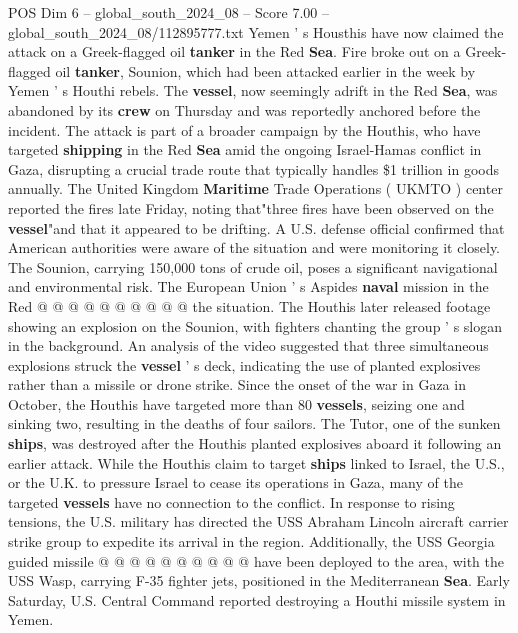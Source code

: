 \begin{textsample}{POS Dim 6 – global\_south\_2024\_08 – Score 7.00 – global\_south\_2024\_08/112895777.txt}  \label{ex:f6_pos_324}
Yemen ' s Housthis have now claimed the attack on a Greek-flagged oil \textbf{tanker} in the Red \textbf{Sea}.
Fire broke out on a Greek-flagged oil \textbf{tanker}, Sounion, which had been attacked earlier in the week by Yemen ' s Houthi rebels.
The \textbf{vessel}, now seemingly adrift in the Red \textbf{Sea}, was abandoned by its \textbf{crew} on Thursday and was reportedly anchored before the incident.
The attack is part of a broader campaign by the Houthis, who have targeted \textbf{shipping} in the Red \textbf{Sea} amid the ongoing Israel-Hamas conflict in Gaza, disrupting a crucial trade route that typically handles \$1 trillion in goods annually.
The United Kingdom \textbf{Maritime} Trade Operations ( UKMTO ) center reported the fires late Friday, noting that"three fires have been observed on the \textbf{vessel}"and that it appeared to be drifting.
A U.S. defense official confirmed that American authorities were aware of the situation and were monitoring it closely.
The Sounion, carrying 150,000 tons of crude oil, poses a significant navigational and environmental risk.
The European Union ' s Aspides \textbf{naval} mission in the Red @ @ @ @ @ @ @ @ @ @ the situation.
The Houthis later released footage showing an explosion on the Sounion, with fighters chanting the group ' s slogan in the background.
An analysis of the video suggested that three simultaneous explosions struck the \textbf{vessel} ' s deck, indicating the use of planted explosives rather than a missile or drone strike.
Since the onset of the war in Gaza in October, the Houthis have targeted more than 80 \textbf{vessels}, seizing one and sinking two, resulting in the deaths of four sailors.
The Tutor, one of the sunken \textbf{ships}, was destroyed after the Houthis planted explosives aboard it following an earlier attack.
While the Houthis claim to target \textbf{ships} linked to Israel, the U.S., or the U.K. to pressure Israel to cease its operations in Gaza, many of the targeted \textbf{vessels} have no connection to the conflict.
In response to rising tensions, the U.S. military has directed the USS Abraham Lincoln aircraft carrier strike group to expedite its arrival in the region.
Additionally, the USS Georgia guided missile @ @ @ @ @ @ @ @ @ @ have been deployed to the area, with the USS Wasp, carrying F-35 fighter jets, positioned in the Mediterranean \textbf{Sea}.
Early Saturday, U.S.
Central Command reported destroying a Houthi missile system in Yemen.

\end{textsample}
